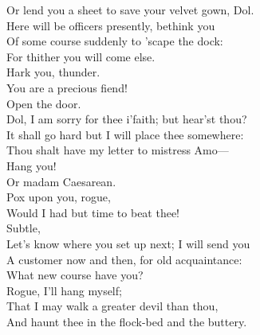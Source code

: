 \documentclass[a4paper,oneside]{memoir}
\begin{document}
\begin{drama*}
Or lend you a sheet to save your velvet gown, Dol.\\
Here will be officers presently, bethink you\\
Of some course suddenly to 'scape the dock:\\
For thither you will come else.\\
Hark you, thunder.\\
\subtlespeaks {} You are a precious fiend!\\
\officeronespeaks {} Open the door.\\
\facespeaks Dol, I am sorry for thee i'faith; but hear'st thou?\\
It shall go hard but I will place thee somewhere:\\
Thou shalt have my letter to mistress Amo---\\
\dolspeaks Hang you!\\
\facespeaks {} Or madam Caesarean.\\
\dolspeaks {} Pox upon you, rogue,\\
Would I had but time to beat thee!\\
\facespeaks {} Subtle,\\
Let's know where you set up next; I will send you\\
A customer now and then, for old acquaintance:\\
What new course have you?\\
\subtlespeaks {} Rogue, I'll hang myself;\\
That I may walk a greater devil than thou,\\
And haunt thee in the flock-bed and the buttery.\\
\scene


\end{drama*}
\end{document}
